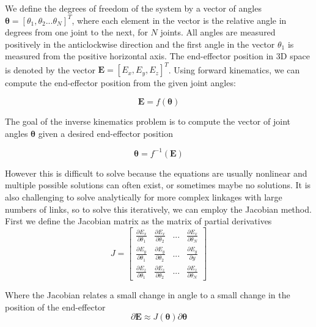 \documentclass[paper=a4, fontsize=11pt]{scrartcl} %
\numberwithin{equation}{section} %
\numberwithin{figure}{section} %
\numberwithin{table}{section} %
\newcommand{\vect}[1]{\mathbf{#1}}
\newcommand{\params}{\boldsymbol{\theta}}
\newcommand{\dn}[1]{\partial{#1}}
\begin{document}
We define the degrees of freedom of the system by a vector of angles $\params = [\theta_1, \theta_2...\theta_N]^T$, where each element in the vector is the relative angle in degrees from one joint to the next, for $N$ joints. All angles are measured positively in the anticlockwise direction and the first angle in the vector $\theta_1$ is measured from the positive horizontal axis. The end-effector position in 3D space is denoted by the vector 
$\vect{E} = [E_x, E_y, E_z]^T$. Using forward kinematics, we can compute the end-effector position from the given joint angles:

\begin{equation}
\vect{E} = f(\params)
\end{equation}

The goal of the inverse kinematics problem is to compute the vector of joint angles $\params$ given a desired end-effector position

\begin{equation}
\params = f^{-1}(\vect{E})
\end{equation}

However this is difficult to solve because the equations are usually nonlinear and multiple possible solutions can often exist, or sometimes maybe no solutions. It is also challenging to solve analytically for more complex linkages with large numbers of links, so to solve this iteratively, we can employ the Jacobian method. First we define the Jacobian matrix as the matrix of partial derivatives
\vspace{1mm}
\begin{equation}
J = \left[
\begin{array}{cccc}
\frac{\dn{E_x}}{\dn{\theta_1}} & \frac{\dn{E_x}}{\dn{\theta_2}} & ... & \frac{\dn{E_x}}{\dn{\theta_N}} 
\\[0.2cm]
\frac{\dn{E_y}}{\dn{\theta_1}} & \frac{\dn{E_y}}{\dn{\theta_2}} & ... & \frac{\dn{E_y}}{\dn{y}} 
\\[0.2cm]
\frac{\dn{E_z}}{\dn{\theta_1}} & \frac{\dn{E_z}}{\dn{\theta_2}} & ... & \frac{\dn{E_z}}{\dn{\theta_N}}
\end{array}
\right]
\end{equation}

Where the Jacobian relates a small change in angle to a small change in the position of the end-effector
\vspace{1mm}
\begin{equation}
\partial \vect{E} \approx J(\params) \partial \params
\end{equation}
\end{document}
